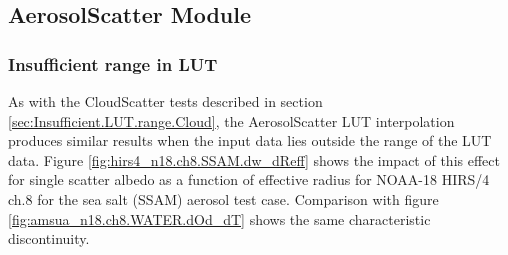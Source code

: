 \subsection{AerosolScatter Module}
\subsubsection{Insufficient range in LUT}
\label{sec:Insufficient.LUT.range.Aerosol}
As with the CloudScatter tests described in section \ref{sec:Insufficient.LUT.range.Cloud}, the AerosolScatter LUT interpolation produces similar results when the input data lies outside the range of the LUT data. Figure \ref{fig:hirs4_n18.ch8.SSAM.dw_dReff} shows the impact of this effect for single scatter albedo as a function of effective radius for NOAA-18 HIRS/4 ch.8 for the sea salt (SSAM) aerosol test case. Comparison with figure \ref{fig:amsua_n18.ch8.WATER.dOd_dT} shows the same characteristic discontinuity.

